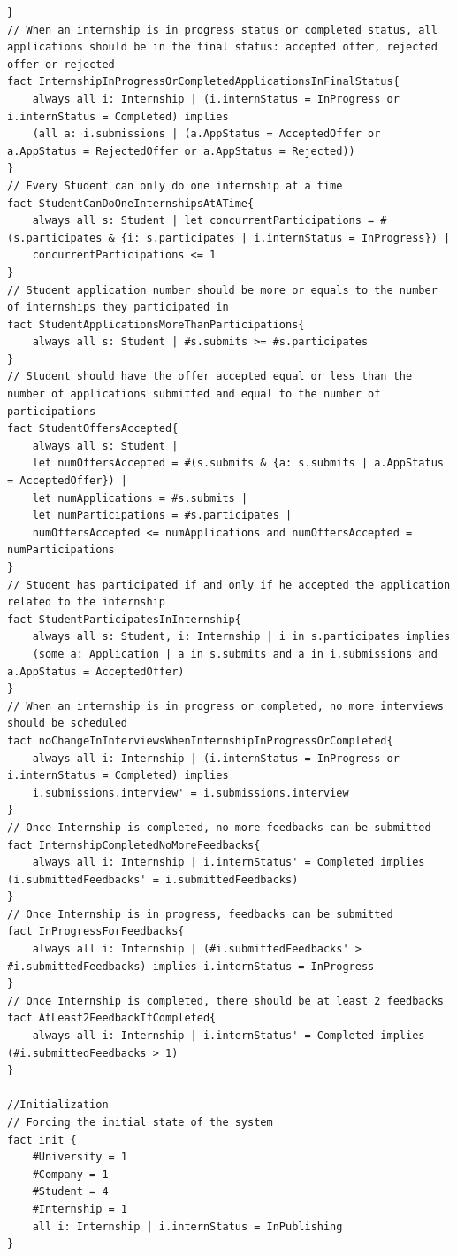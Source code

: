 \begin{lstlisting}
}
// When an internship is in progress status or completed status, all applications should be in the final status: accepted offer, rejected offer or rejected
fact InternshipInProgressOrCompletedApplicationsInFinalStatus{
    always all i: Internship | (i.internStatus = InProgress or i.internStatus = Completed) implies
    (all a: i.submissions | (a.AppStatus = AcceptedOffer or a.AppStatus = RejectedOffer or a.AppStatus = Rejected))
}
// Every Student can only do one internship at a time
fact StudentCanDoOneInternshipsAtATime{
    always all s: Student | let concurrentParticipations = #(s.participates & {i: s.participates | i.internStatus = InProgress}) |
    concurrentParticipations <= 1
}
// Student application number should be more or equals to the number of internships they participated in
fact StudentApplicationsMoreThanParticipations{
    always all s: Student | #s.submits >= #s.participates 
}
// Student should have the offer accepted equal or less than the number of applications submitted and equal to the number of participations
fact StudentOffersAccepted{
    always all s: Student | 
    let numOffersAccepted = #(s.submits & {a: s.submits | a.AppStatus = AcceptedOffer}) |
    let numApplications = #s.submits |
    let numParticipations = #s.participates |
    numOffersAccepted <= numApplications and numOffersAccepted = numParticipations
}
// Student has participated if and only if he accepted the application related to the internship
fact StudentParticipatesInInternship{
    always all s: Student, i: Internship | i in s.participates implies
    (some a: Application | a in s.submits and a in i.submissions and a.AppStatus = AcceptedOffer)
}
// When an internship is in progress or completed, no more interviews should be scheduled
fact noChangeInInterviewsWhenInternshipInProgressOrCompleted{
    always all i: Internship | (i.internStatus = InProgress or i.internStatus = Completed) implies
    i.submissions.interview' = i.submissions.interview
}
// Once Internship is completed, no more feedbacks can be submitted
fact InternshipCompletedNoMoreFeedbacks{
    always all i: Internship | i.internStatus' = Completed implies (i.submittedFeedbacks' = i.submittedFeedbacks)
}
// Once Internship is in progress, feedbacks can be submitted
fact InProgressForFeedbacks{
    always all i: Internship | (#i.submittedFeedbacks' > #i.submittedFeedbacks) implies i.internStatus = InProgress
}
// Once Internship is completed, there should be at least 2 feedbacks
fact AtLeast2FeedbackIfCompleted{
    always all i: Internship | i.internStatus' = Completed implies (#i.submittedFeedbacks > 1)
}

//Initialization
// Forcing the initial state of the system
fact init {
    #University = 1
    #Company = 1
    #Student = 4
    #Internship = 1
    all i: Internship | i.internStatus = InPublishing
}
\end{lstlisting}

